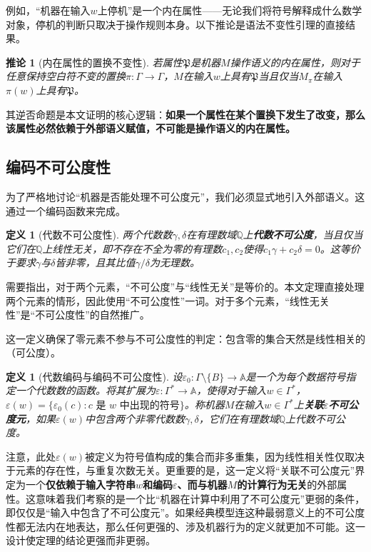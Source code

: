 \documentclass{ctexart}
\newtheorem{corollary}[theorem]{推论}
\newtheorem{definition}[theorem]{定义}
\begin{document}
	例如，``机器在输入$w$上停机''是一个内在属性——无论我们将符号解释成什么数学对象，停机的判断只取决于操作规则本身。以下推论是语法不变性引理的直接结果。
	
	\begin{corollary}[内在属性的置换不变性]\label{cor:intrinsic}
		若属性$\mathfrak{P}$是机器$M$操作语义的内在属性，则对于任意保持空白符不变的置换$\pi: \Gamma \to \Gamma$，$M$在输入$w$上具有$\mathfrak{P}$当且仅当$M_\pi$在输入$\pi(w)$上具有$\mathfrak{P}$。
	\end{corollary}
	
	其逆否命题是本文证明的核心逻辑：\textbf{如果一个属性在某个置换下发生了改变，那么该属性必然依赖于外部语义赋值，不可能是操作语义的内在属性。}
	
	\subsection{编码不可公度性}
	
	为了严格地讨论``机器是否能处理不可公度元''，我们必须显式地引入外部语义。这通过一个编码函数来完成。
	
	\begin{definition}[代数不可公度性]
		两个代数数$\gamma, \delta$在有理数域$\mathbb{Q}$上\textbf{代数不可公度}，当且仅当它们在$\mathbb{Q}$上线性无关，即不存在不全为零的有理数$c_1, c_2$使得$c_1\gamma + c_2\delta = 0$。这等价于要求$\gamma$与$\delta$皆非零，且其比值$\gamma/\delta$为无理数。
	\end{definition}
	
	需要指出，对于两个元素，``不可公度''与``线性无关''是等价的。本文定理直接处理两个元素的情形，因此使用``不可公度性''一词。对于多个元素，``线性无关性''是``不可公度性''的自然推广。
	
	这一定义确保了零元素不参与不可公度性的判定：包含零的集合天然是线性相关的（可公度）。
	
	\begin{definition}[代数编码与编码不可公度性]
		设$\varepsilon_0: \Gamma \setminus \{B\} \to \mathbb{A}$是一个为每个数据符号指定一个代数数的函数。将其扩展为$\varepsilon: \Gamma^* \to \mathbb{A}$，使得对于输入$w \in \Gamma^*$，$\varepsilon(w) = \{\varepsilon_0(c) : c \text{ 是 } w \text{ 中出现的符号}\}$。称机器$M$在输入$w \in \Gamma^*$上\textbf{关联$\varepsilon$不可公度元}，如果$\varepsilon(w)$中包含两个非零代数数$\gamma, \delta$，它们在有理数域$\mathbb{Q}$上代数不可公度。
	\end{definition}
	
	注意，此处$\varepsilon(w)$被定义为符号值构成的集合而非多重集，因为线性相关性仅取决于元素的存在性，与重复次数无关。更重要的是，这一定义将``关联不可公度元''界定为一个\textbf{仅依赖于输入字符串$w$和编码$\varepsilon$、而与机器$M$的计算行为无关}的外部属性。这意味着我们考察的是一个比``机器在计算中利用了不可公度元''更弱的条件，即仅仅是``输入中包含了不可公度元''。如果经典模型连这种最弱意义上的不可公度性都无法内在地表达，那么任何更强的、涉及机器行为的定义就更加不可能。这一设计使定理的结论更强而非更弱。
	
\end{document}
